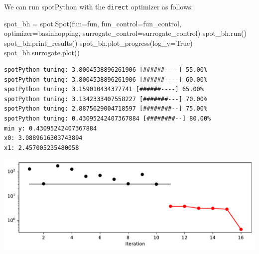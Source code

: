 \documentclass[
  letterpaper,
  DIV=11,
  numbers=noendperiod]{scrreprt}
\newenvironment{Shaded}{\begin{snugshade}}{\end{snugshade}}
\newcommand{\NormalTok}[1]{\textcolor[rgb]{0.00,0.23,0.31}{#1}}
\newcommand{\OperatorTok}[1]{\textcolor[rgb]{0.37,0.37,0.37}{#1}}
\newcommand{\VariableTok}[1]{\textcolor[rgb]{0.07,0.07,0.07}{#1}}
\begin{document}
\begin{tcolorbox}[enhanced jigsaw, coltitle=black, bottomrule=.15mm, breakable, toprule=.15mm, colframe=quarto-callout-tip-color-frame, title=\textcolor{quarto-callout-tip-color}{\faLightbulb}\hspace{0.5em}{Tip: Selecting the Optimizer for the Surrogate}, colbacktitle=quarto-callout-tip-color!10!white, opacityback=0, left=2mm, leftrule=.75mm, colback=white, rightrule=.15mm, bottomtitle=1mm, toptitle=1mm, titlerule=0mm, arc=.35mm, opacitybacktitle=0.6]

We can run spotPython with the \texttt{direct} optimizer as follows:

\begin{Shaded}
\begin{Highlighting}[]
\NormalTok{spot\_bh }\OperatorTok{=}\NormalTok{ spot.Spot(fun}\OperatorTok{=}\NormalTok{fun,}
\NormalTok{                    fun\_control}\OperatorTok{=}\NormalTok{fun\_control,}
\NormalTok{                    optimizer}\OperatorTok{=}\NormalTok{basinhopping,}
\NormalTok{                    surrogate\_control}\OperatorTok{=}\NormalTok{surrogate\_control)}
\NormalTok{spot\_bh.run()}
\NormalTok{spot\_bh.print\_results()}
\NormalTok{spot\_bh.plot\_progress(log\_y}\OperatorTok{=}\VariableTok{True}\NormalTok{)}
\NormalTok{spot\_bh.surrogate.plot()}
\end{Highlighting}
\end{Shaded}

\begin{verbatim}
spotPython tuning: 3.8004538896261906 [######----] 55.00% 
spotPython tuning: 3.8004538896261906 [######----] 60.00% 
spotPython tuning: 3.159010434377741 [######----] 65.00% 
spotPython tuning: 3.1342333407558227 [#######---] 70.00% 
spotPython tuning: 2.8875629004718597 [########--] 75.00% 
spotPython tuning: 0.43095242407367884 [########--] 80.00% 
min y: 0.43095242407367884
x0: 3.0889616303743894
x1: 2.457005235480058
\end{verbatim}

\includegraphics{004_spot_sklearn_optimization_files/figure-pdf/cell-12-output-2.pdf}


\end{tcolorbox}
\end{document}
